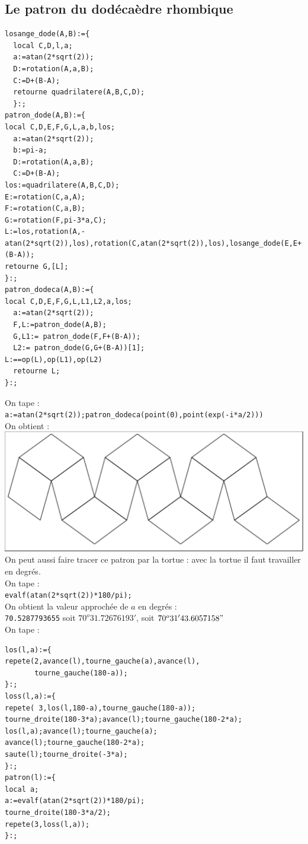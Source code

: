 \documentclass[a4paper,11pt]{book}
\begin{document}
\subsection{Le patron du dod\'eca\`edre rhombique}
\begin{verbatim}
losange_dode(A,B):={
  local C,D,l,a;
  a:=atan(2*sqrt(2));
  D:=rotation(A,a,B);
  C:=D+(B-A);
  retourne quadrilatere(A,B,C,D);
  }:;
patron_dode(A,B):={
local C,D,E,F,G,L,a,b,los;
  a:=atan(2*sqrt(2));
  b:=pi-a;
  D:=rotation(A,a,B);
  C:=D+(B-A);
los:=quadrilatere(A,B,C,D);
E:=rotation(C,a,A);
F:=rotation(C,a,B);
G:=rotation(F,pi-3*a,C);
L:=los,rotation(A,-atan(2*sqrt(2)),los),rotation(C,atan(2*sqrt(2)),los),losange_dode(E,E+(B-A));
retourne G,[L];
}:;
patron_dodeca(A,B):={
local C,D,E,F,G,L,L1,L2,a,los;
  a:=atan(2*sqrt(2));
  F,L:=patron_dode(A,B);
  G,L1:= patron_dode(F,F+(B-A));
  L2:= patron_dode(G,G+(B-A))[1];
L:==op(L),op(L1),op(L2)
  retourne L;
}:;
\end{verbatim}
On tape :\\
{\tt a:=atan(2*sqrt(2));patron\_dodeca(point(0),point(exp(-i*a/2)))}\\
On obtient :\\
\includegraphics[width=\textwidth]{patrondode}\\
On peut aussi faire tracer ce patron par la tortue : avec la tortue il faut 
travailler en degr\'es. \\
On tape :\\
{\tt evalf(atan(2*sqrt(2))*180/pi);}\\
On obtient la valeur approch\'ee de $a$ en degr\'es :\\
{\tt 70.5287793655} soit
$70^o31.72676193'$, soit $70^o31'43.6057158"$\\
On tape :\\
\begin{verbatim}
los(l,a):={
repete(2,avance(l),tourne_gauche(a),avance(l),
       tourne_gauche(180-a));
}:;
loss(l,a):={
repete( 3,los(l,180-a),tourne_gauche(180-a));
tourne_droite(180-3*a);avance(l);tourne_gauche(180-2*a);
los(l,a);avance(l);tourne_gauche(a); 
avance(l);tourne_gauche(180-2*a); 
saute(l);tourne_droite(-3*a);
}:;
patron(l):={
local a;
a:=evalf(atan(2*sqrt(2))*180/pi);
tourne_droite(180-3*a/2);
repete(3,loss(l,a));
}:;
\end{verbatim}
\end{document}

